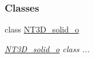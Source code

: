 \subsubsection*{Classes}
\begin{DoxyCompactItemize}
\item 
class \hyperlink{class_n_t3_d__solid__o}{NT3D\_\-solid\_\-o}
\begin{DoxyCompactList}\small\item\em \hyperlink{class_n_t3_d__solid__o}{NT3D\_\-solid\_\-o} class ... \item\end{DoxyCompactList}\end{DoxyCompactItemize}
